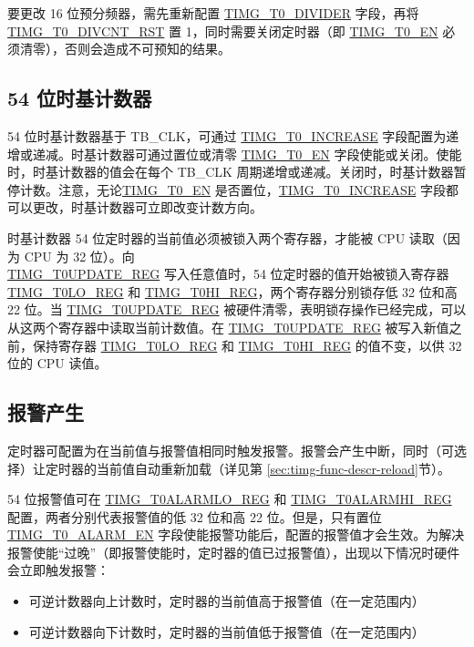 \documentclass[main\_\_CN.tex]{subfiles}
\begin{document}
要更改 16 位预分频器，需先重新配置 \hyperref[fielddesc:TIMGTXDIVIDER]{TIMG\_T0\_DIVIDER} 字段，再将 \hyperref[{fielddesc:TIMGTXDIVCNTRST}]{TIMG\_T0\_DIVCNT\_RST} 置 1，同时需要关闭定时器（即 \hyperref[fielddesc:TIMGTXEN]{TIMG\_T0\_EN} 必须清零），否则会造成不可预知的结果。

\subsection{54 位时基计数器}

54 位时基计数器基于 TB\_CLK，可通过 \hyperref[fielddesc:TIMGTXINCREASE]{TIMG\_T0\_INCREASE} 字段配置为递增或递减。时基计数器可通过置位或清零 \hyperref[fielddesc:TIMGTXEN]{TIMG\_T0\_EN} 字段使能或关闭。使能时，时基计数器的值会在每个 TB\_CLK 周期递增或递减。关闭时，时基计数器暂停计数。注意，无论\hyperref[fielddesc:TIMGTXEN]{TIMG\_T0\_EN} 是否置位，\hyperref[fielddesc:TIMGTXINCREASE]{TIMG\_T0\_INCREASE} 字段都可以更改，时基计数器可立即改变计数方向。

时基计数器 54 位定时器的当前值必须被锁入两个寄存器，才能被 CPU 读取（因为 CPU 为 32 位）。向 \\\hyperref[regdesc:TIMGTXUPDATEREG]{TIMG\_T0UPDATE\_REG} 写入任意值时，54 位定时器的值开始被锁入寄存器 \hyperref[regdesc:TIMGTXLOREG]{TIMG\_T0LO\_REG} 和 \hyperref[regdesc:TIMGTXHIREG]{TIMG\_T0HI\_REG}，两个寄存器分别锁存低 32 位和高 22 位。当 \hyperref[regdesc:TIMGTXUPDATEREG]{TIMG\_T0UPDATE\_REG} 被硬件清零，表明锁存操作已经完成，可以从这两个寄存器中读取当前计数值。在 \hyperref[regdesc:TIMGTXUPDATEREG]{TIMG\_T0UPDATE\_REG} 被写入新值之前，保持寄存器 \hyperref[regdesc:TIMGTXLOREG]{TIMG\_T0LO\_REG} 和 \hyperref[regdesc:TIMGTXHIREG]{TIMG\_T0HI\_REG} 的值不变，以供 32 位的 CPU 读值。

\subsection{报警产生}
定时器可配置为在当前值与报警值相同时触发报警。报警会产生中断，同时（可选择）让定时器的当前值自动重新加载（详见第 \ref{sec:timg-func-descr-reload}节）。

54 位报警值可在 \hyperref[regdesc:TIMGTXALARMLOREG]{TIMG\_T0ALARMLO\_REG} 和 \hyperref[regdesc:TIMGTXALARMHIREG]{TIMG\_T0ALARMHI\_REG} 配置，两者分别代表报警值的低 32 位和高 22 位。但是，只有置位 \hyperref[fielddesc:TIMGTXALARMEN]{TIMG\_T0\_ALARM\_EN} 字段使能报警功能后，配置的报警值才会生效。为解决报警使能“过晚”（即报警使能时，定时器的值已过报警值），出现以下情况时硬件会立即触发报警：
\begin{itemize}
    \item 可逆计数器向上计数时，定时器的当前值高于报警值（在一定范围内）
    \item 可逆计数器向下计数时，定时器的当前值低于报警值（在一定范围内）
\end{itemize}
\end{document}
